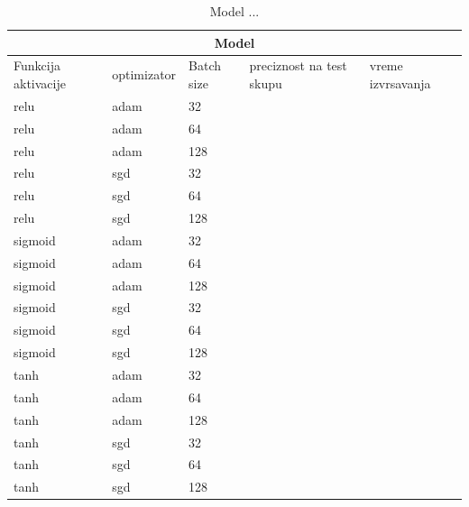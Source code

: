 \documentclass[a4paper]{article}
\begin{document}
\begin{table}[h!]
\begin{center}
\caption{Model ...}
\begin{tabular}{ |p{1.5cm}||p{2cm}|p{1cm}|p{1.5cm}|p{1cm}| }
 \hline
 \multicolumn{5}{|c|}{Model} \\
 \hline
 Funkcija aktivacije & optimizator & Batch size & preciznost na test skupu & vreme izvrsavanja\\
 \hline
 relu    & adam & 32  &   &   \\
 relu    & adam & 64  &   &   \\
 relu    & adam & 128 &   &   \\
 relu    & sgd  & 32  &   &   \\
 relu    & sgd  & 64  &   &   \\
 relu    & sgd  & 128 &   &   \\
 sigmoid & adam & 32  &   &   \\
 sigmoid & adam & 64  &   &   \\
 sigmoid & adam & 128 &   &   \\
 sigmoid & sgd  & 32  &   &   \\
 sigmoid & sgd  & 64  &   &   \\
 sigmoid & sgd  & 128 &   &   \\
 tanh    & adam & 32  &   &   \\
 tanh    & adam & 64  &   &   \\
 tanh    & adam & 128 &   &   \\
 tanh    & sgd  & 32  &   &   \\
 tanh    & sgd  & 64  &   &   \\
 tanh    & sgd  & 128 &   &   \\

 \hline
\end{tabular}
\end{center}
\end{table}
\end{document}
